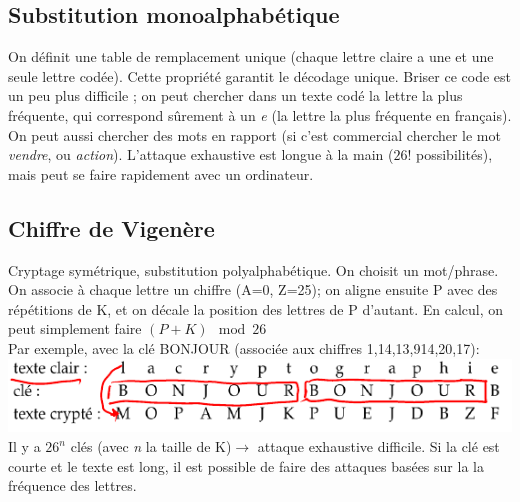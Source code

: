 \documentclass[11pt,a4paper]{article}
\renewcommand{\)}{\right)}
\renewcommand{\(}{\left(}
\begin{document}
\subsection{Substitution monoalphabétique}
On définit une table de remplacement unique (chaque lettre claire a une et une seule lettre codée). Cette propriété garantit le décodage unique. Briser ce code est un peu plus difficile ; on peut chercher dans un texte codé la lettre la plus fréquente, qui correspond sûrement à un \textit{e} (la lettre la plus fréquente en français). On peut aussi chercher des mots en rapport (si c'est commercial chercher le mot \textit{vendre}, ou \textit{action}). L'attaque exhaustive est longue à la main ($26!$ possibilités), mais peut se faire rapidement avec un ordinateur.
\subsection{Chiffre de Vigenère}
Cryptage symétrique, substitution polyalphabétique. On choisit un mot/phrase. On associe à chaque lettre un chiffre (A=0, Z=25); on aligne ensuite P avec des répétitions de K, et on décale la position des lettres de P d'autant. En calcul, on peut simplement faire $(P+K)\mod 26$ \\
Par exemple, avec la clé BONJOUR (associée aux chiffres 1,14,13,914,20,17): \\
\includegraphics[scale=0.7]{images/vigenere}\\
Il y a $26^n$ clés (avec \textit{n} la taille de K)$\to$ attaque exhaustive difficile. Si la clé est courte et le texte est long, il est possible de faire des attaques basées sur la la fréquence des lettres.
\end{document}
